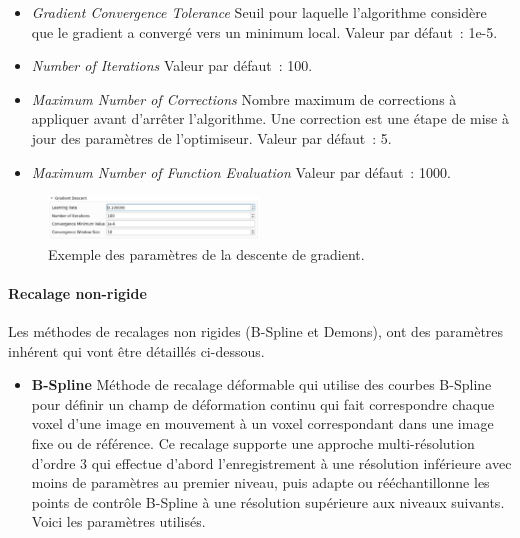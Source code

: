 \documentclass{article}
\newcommand{\subsubsubsection}[1]{\paragraph{#1}\par\noindent\bigskip}
\begin{document}
{{\begin{itemize}
            \begin{itemize}
                \item \textit{Gradient Convergence Tolerance} Seuil pour laquelle l'algorithme considère que le gradient a convergé vers un minimum local. Valeur par défaut~: 1e-5.

                \item \textit{Number of Iterations} Valeur par défaut~: 100.

                \item \textit{Maximum Number of Corrections} Nombre maximum de corrections à appliquer avant d'arrêter l'algorithme. Une correction est une étape de mise à jour des paramètres de l'optimiseur. Valeur par défaut~: 5.

                \item \textit{Maximum Number of Function Evaluation} Valeur par défaut~: 1000.
            \end{itemize}
        \end{itemize}

        \bigskip

        \begin{figure}[!ht]
            \centering
            \includegraphics[width=0.5\textwidth]{images/registration_gd.png}
            \caption{Exemple des paramètres de la descente de gradient.}
            \label{fig:registration_gd}
        \end{figure}

        \bigskip
        \subsubsubsection{Recalage non-rigide}

        Les méthodes de recalages non rigides (B-Spline et Demons), ont des paramètres inhérent qui vont être détaillés ci-dessous.

        \begin{itemize}
            \item \textbf{B-Spline} Méthode de recalage déformable qui utilise des courbes B-Spline pour définir un champ de déformation continu qui fait correspondre chaque voxel d'une image en mouvement à un voxel correspondant dans une image fixe ou de référence. Ce recalage supporte une approche multi-résolution d'ordre 3 qui effectue d'abord l'enregistrement à une résolution inférieure avec moins de paramètres au premier niveau, puis adapte ou rééchantillonne les points de contrôle B-Spline à une résolution supérieure aux niveaux suivants. Voici les paramètres utilisés.


\end{itemize}}}
\end{document}
